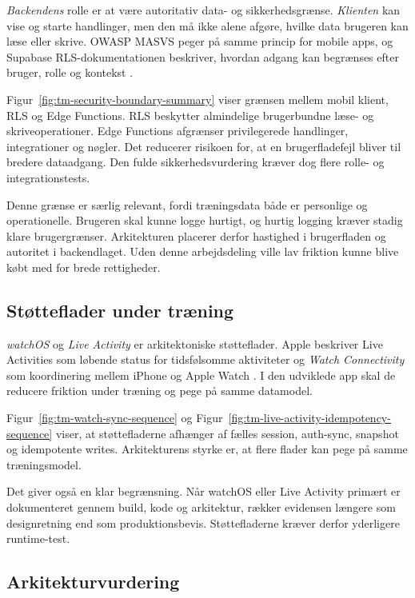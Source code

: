 \emph{Backendens} rolle er at være autoritativ data- og sikkerhedsgrænse. \emph{Klienten} kan vise og starte handlinger, men den må ikke alene afgøre, hvilke data brugeren kan læse eller skrive. OWASP MASVS peger på samme princip for mobile apps, og Supabase RLS-dokumentationen beskriver, hvordan adgang kan begrænses efter bruger, rolle og kontekst \cite{owasp2024_masvs,supabase_rls_docs,supabase_securing_api_docs}.

Figur~\ref{fig:tm-security-boundary-summary} viser grænsen mellem mobil klient, RLS og Edge Functions. RLS beskytter almindelige brugerbundne læse- og skriveoperationer. Edge Functions afgrænser privilegerede handlinger, integrationer og nøgler. Det reducerer risikoen for, at en brugerfladefejl bliver til bredere dataadgang. Den fulde sikkerhedsvurdering kræver dog flere rolle- og integrationstests.

Denne grænse er særlig relevant, fordi træningsdata både er personlige og operationelle. Brugeren skal kunne logge hurtigt, og hurtig logging kræver stadig klare brugergrænser. Arkitekturen placerer derfor hastighed i brugerfladen og autoritet i backendlaget. Uden denne arbejdsdeling ville lav friktion kunne blive købt med for brede rettigheder.

\subsection{Støtteflader under træning}

\emph{watchOS} og \emph{Live Activity} er arkitektoniske støtteflader. Apple beskriver Live Activities som løbende status for tidsfølsomme aktiviteter og \emph{Watch Connectivity} som koordinering mellem iPhone og Apple Watch \cite{apple_activitykit_live_data_docs,apple_hig_live_activities,apple_watchconnectivity_docs}. I den udviklede app skal de reducere friktion under træning og pege på samme datamodel.

Figur~\ref{fig:tm-watch-sync-sequence} og Figur~\ref{fig:tm-live-activity-idempotency-sequence} viser, at støttefladerne afhænger af fælles session, auth-sync, snapshot og idempotente writes. Arkitekturens styrke er, at flere flader kan pege på samme træningsmodel.

Det giver også en klar begrænsning. Når watchOS eller Live Activity primært er dokumenteret gennem build, kode og arkitektur, rækker evidensen længere som designretning end som produktionsbevis. Støttefladerne kræver derfor yderligere runtime-test.

\subsection{Arkitekturvurdering}

